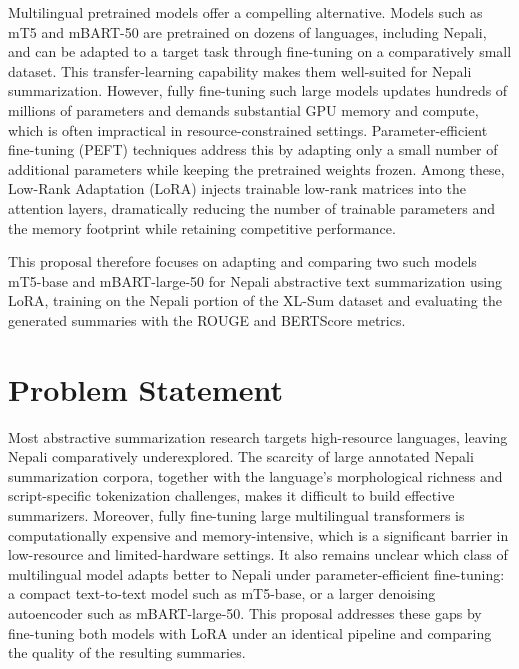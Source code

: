 \documentclass[12pt]{report}
\begin{document}
Multilingual pretrained models offer a compelling alternative. Models such as mT5 \cite{xue2021mt5} and mBART-50 \cite{tang2020multilingual, liu2020multilingual} are pretrained on dozens of languages, including Nepali, and can be adapted to a target task through fine-tuning on a comparatively small dataset. This transfer-learning capability makes them well-suited for Nepali summarization. However, fully fine-tuning such large models updates hundreds of millions of parameters and demands substantial GPU memory and compute, which is often impractical in resource-constrained settings. Parameter-efficient fine-tuning (PEFT) techniques address this by adapting only a small number of additional parameters while keeping the pretrained weights frozen. Among these, Low-Rank Adaptation (LoRA) \cite{hu2021lora} injects trainable low-rank matrices into the attention layers, dramatically reducing the number of trainable parameters and the memory footprint while retaining competitive performance.

This proposal therefore focuses on adapting and comparing two such models mT5-base and mBART-large-50 for Nepali abstractive text summarization using LoRA, training on the Nepali portion of the XL-Sum dataset \cite{hasan2021xlsum} and evaluating the generated summaries with the ROUGE \cite{lin2004rouge} and BERTScore \cite{zhang2020bertscore} metrics.


\section{Problem Statement}
Most abstractive summarization research targets high-resource languages, leaving Nepali comparatively underexplored. The scarcity of large annotated Nepali summarization corpora, together with the language's morphological richness and script-specific tokenization challenges, makes it difficult to build effective summarizers. Moreover, fully fine-tuning large multilingual transformers is computationally expensive and memory-intensive, which is a significant barrier in low-resource and limited-hardware settings. It also remains unclear which class of multilingual model adapts better to Nepali under parameter-efficient fine-tuning: a compact text-to-text model such as mT5-base, or a larger denoising autoencoder such as mBART-large-50. This proposal addresses these gaps by fine-tuning both models with LoRA under an identical pipeline and comparing the quality of the resulting summaries.
\end{document}
